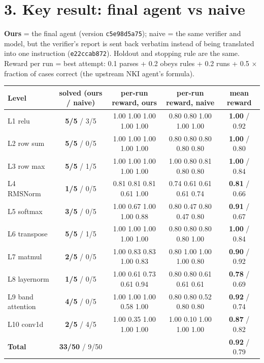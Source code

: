\documentclass[11pt]{article}
\newcommand{\code}[1]{\texttt{#1}}
\newcommand{\ours}[1]{\textcolor{blue!60!black}{\textbf{#1}}}
\newcommand{\naive}[1]{\textcolor{orange!70!black}{#1}}
\begin{document}
\section*{3. Key result: final agent vs naive}
\ours{Ours} = the final agent (version \code{c5e98d5a75}); \naive{naive} = the same verifier and model, but
the verifier's report is sent back verbatim instead of being translated into one instruction
(\code{e22ccab872}). Holdout and stopping rule are the same. Reward per run = best attempt: 0.1 parses
+ 0.2 obeys rules + 0.2 runs + 0.5 $\times$ fraction of cases correct (the upstream NKI agent's formula).

\begin{center}\small
\begin{tabular}{@{}lcccc@{}}\toprule
Level & solved (ours / naive) & per-run reward, ours & per-run reward, naive & mean reward \\\midrule
L1 relu & \ours{5/5} / \naive{3/5} & 1.00 1.00 1.00 1.00 1.00 & 0.80 0.80 1.00 1.00 1.00 & \ours{1.00} / \naive{0.92}\\
L2 row sum & \ours{5/5} / \naive{0/5} & 1.00 1.00 1.00 1.00 1.00 & 0.80 0.80 0.80 0.80 0.80 & \ours{1.00} / \naive{0.80}\\
L3 row max & \ours{5/5} / \naive{1/5} & 1.00 1.00 1.00 1.00 1.00 & 1.00 0.80 0.81 0.80 0.80 & \ours{1.00} / \naive{0.84}\\
L4 RMSNorm & \ours{1/5} / \naive{0/5} & 0.81 0.81 0.81 0.61 1.00 & 0.74 0.61 0.61 0.61 0.74 & \ours{0.81} / \naive{0.66}\\
L5 softmax & \ours{3/5} / \naive{0/5} & 1.00 0.67 1.00 1.00 0.88 & 0.80 0.47 0.80 0.47 0.80 & \ours{0.91} / \naive{0.67}\\
L6 transpose & \ours{5/5} / \naive{1/5} & 1.00 1.00 1.00 1.00 1.00 & 0.80 0.80 0.80 0.80 1.00 & \ours{1.00} / \naive{0.84}\\
L7 matmul & \ours{2/5} / \naive{0/5} & 1.00 0.83 0.83 1.00 0.83 & 0.80 1.00 1.00 1.00 0.80 & \ours{0.90} / \naive{0.92}\\
L8 layernorm & \ours{1/5} / \naive{0/5} & 1.00 0.61 0.73 0.61 0.94 & 0.80 0.80 0.61 0.61 0.61 & \ours{0.78} / \naive{0.69}\\
L9 band attention & \ours{4/5} / \naive{0/5} & 1.00 1.00 1.00 0.58 1.00 & 0.80 0.80 0.52 0.80 0.80 & \ours{0.92} / \naive{0.74}\\
L10 conv1d & \ours{2/5} / \naive{4/5} & 1.00 0.35 1.00 1.00 1.00 & 1.00 0.10 1.00 1.00 1.00 & \ours{0.87} / \naive{0.82}\\
\midrule
\textbf{Total} & \ours{33/50} / \naive{9/50} & & & \ours{0.92} / \naive{0.79}\\
\bottomrule
\end{tabular}\end{center}
\end{document}
